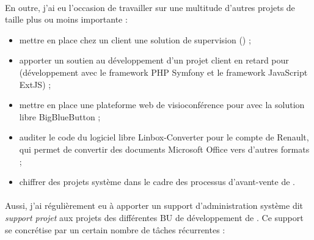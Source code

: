 \paragraph{}
En outre, j'ai eu l'occasion de travailler sur une multitude d'autres projets de taille plus ou moins importante :

\begin{itemize}
	\item mettre en place chez un client une solution de supervision \acentreon{} () ;
	\item apporter un soutien au développement d'un projet client en retard pour \abt{} (développement avec le framework PHP Symfony et le framework JavaScript ExtJS) ;
	\item mettre en place une plateforme web de visioconférence pour \asmile{} avec la solution libre BigBlueButton ;
	\item auditer le code du logiciel libre Linbox-Converter pour le compte de Renault, qui permet de convertir des documents Microsoft Office vers d'autres formats ;
	\item chiffrer des projets système dans le cadre des processus d'avant-vente de \asmile.
\end{itemize}

\paragraph{}
Aussi, j'ai régulièrement eu à apporter un support d'administration système dit \emph{support projet} aux projets des différentes BU de développement de \asmile{}.
Ce support se concrétise par un certain nombre de tâches récurrentes :

